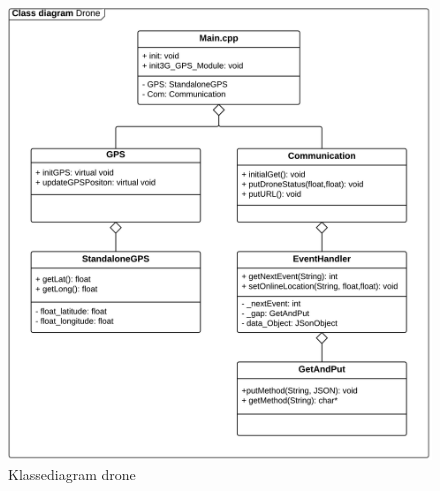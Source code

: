 \begin{figure}[H]
	\centering
	\includegraphics[width=1\textwidth]{Billeder/classdiagram.png}
	\vspace{-0.6cm}	
	\caption{Klassediagram drone}
	\label{fig:class_drone}
\end{figure}